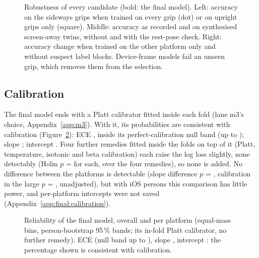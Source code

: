 \begin{figure}[htbp]
\centering
{}
\caption{Robustness of every candidate (bold: the final model). Left: accuracy on the sideways grips when trained
on every grip (dot) or on upright grips only (square). Middle: accuracy as recorded and on synthesised screen-away
twins, without and with the rest-pose check. Right: accuracy change when trained on the other platform only and
without suspect label blocks. Device-frame models fail an unseen grip, which removes them from the selection.}
\label{fig:FINAL_06_robustness}
\end{figure}

\subsection{Calibration}\label{sec:results:calibration}
The final model ends with a Platt calibrator fitted inside each fold (lane m3's choice, Appendix~\ref{app:m3}). With
it, its probabilities are consistent with calibration (Figure~\ref{fig:FINAL_08_calibration}): ECE
, inside its perfect-calibration null band (up to ); slope
; intercept . Four further remedies fitted inside the
folds on top of it (Platt, temperature, isotonic and beta calibration) each raise the log loss slightly, none
detectably (Holm $p$ =  for each, over the four remedies), so none is added. No difference between the platforms is detectable
(slope difference $p$ = , calibration in the large $p$ = ,
unadjusted), but with  iOS persons this comparison has little power, and per-platform
intercepts were not saved (Appendix~\ref{app:final:calibration}).

\begin{figure}[htbp]
\centering
{}
\caption{Reliability of the final model, overall and per platform (equal-mass bins, person-bootstrap 95\,\% bands;
its in-fold Platt calibrator, no further remedy). ECE  (null band up to ), slope
, intercept : the percentage shown is consistent with
calibration.}
\label{fig:FINAL_08_calibration}
\end{figure}


